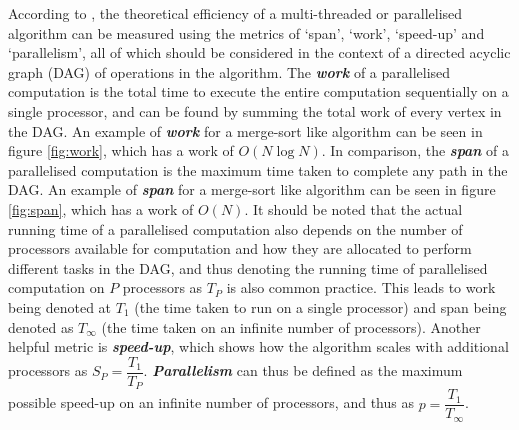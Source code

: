 \documentclass{article}
\begin{document}
According to \cite{CLRS_parallel}, the theoretical efficiency of a multi-threaded or parallelised algorithm can be measured using the metrics of `span', `work', `speed-up' and `parallelism', all of which should be considered in the context of a directed acyclic graph (DAG) of operations in the algorithm.
The \textit{\textbf{work}} of a parallelised computation is the total time to execute the entire computation sequentially on a single processor, and can be found by summing the total work of every vertex in the DAG.
An example of \textit{\textbf{work}} for a merge-sort like algorithm can be seen in figure \ref{fig:work}, which has a work of \(O(N\log{N})\).
In comparison, the \textit{\textbf{span}} of a parallelised computation is the maximum time taken to complete any path in the DAG.
An example of \textit{\textbf{span}} for a merge-sort like algorithm can be seen in figure \ref{fig:span}, which has a work of \(O(N)\).
It should be noted that the actual running time of a parallelised computation also depends on the number of processors available for computation and how they are allocated to perform different tasks in the DAG, and thus denoting the running time of parallelised computation on \(P\) processors as \(T_P\) is also common practice.
This leads to work being denoted at \(T_1\) (the time taken to run on a single processor) and span being denoted as \(T_\infty\) (the time taken on an infinite number of processors).
Another helpful metric is \textit{\textbf{speed-up}}, which shows how the algorithm scales with additional processors as \(S_P = \dfrac{T_1}{T_P}\).
\textit{\textbf{Parallelism}} can thus be defined as the maximum possible speed-up on an infinite number of processors, and thus as \(p = \dfrac{T_1}{T_\infty}\).
\end{document}
